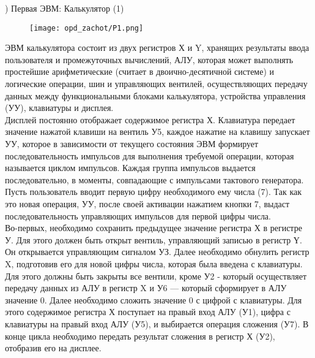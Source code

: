 ) Первая ЭВМ: Калькулятор (1) \\
\begin{figure}[H]
    \centering
    \texttt{[image: opd\_zachot/P1.png]}
\end{figure}
\noindent ЭВМ калькулятора состоит из двух регистров Х и Y, хранящих результаты ввода пользователя и промежуточных вычислений, АЛУ, которая может выполнять простейшие арифметические (считает в двоично-десятичной системе) и логические операции, шин и управляющих вентилей, осуществляющих передачу данных между функциональными блоками калькулятора, устройства управления (УУ), клавиатуры и дисплея. \\
Дисплей постоянно отображает содержимое регистра Х. Клавиатура передает значение нажатой клавиши на вентиль У5, каждое нажатие на клавишу запускает УУ, которое в зависимости от текущего состояния ЭВМ формирует последовательность импульсов для выполнения требуемой операции, которая называется циклом импульсов. Каждая группа импульсов выдается последовательно, в моменты, совпадающие с импульсами тактового генератора. \\
Пусть пользователь вводит первую цифру необходимого ему числа (7). Так как это новая операция, УУ, после своей активации нажатием кнопки 7, выдаст последовательность управляющих импульсов для первой цифры числа. \\
Во-первых, необходимо сохранить предыдущее значение регистра Х в регистре У. Для этого должен быть открыт вентиль, управляющий записью в регистр Ү. Он открывается управляющим сигналом УЗ. Далее необходимо обнулить регистр X, подготовив его для новой цифры числа, которая была введена с клавиатуры. Для этого должны быть закрыты все вентили, кроме У2 - который осуществляет передачу данных из АЛУ в регистр X и У6 — который сформирует в АЛУ значение 0. Далее необходимо сложить значение 0 с цифрой с клавиатуры. Для этого содержимое регистра Х поступает на правый вход АЛУ (У1), цифра с клавиатуры на правый вход АЛУ (У5), и выбирается операция сложения (У7). В конце цикла необходимо передать результат сложения в регистр Х (У2), отобразив его на дисплее. \\

